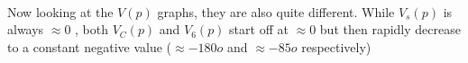 
\paragraph{} Now looking at the $V(p)$ graphs, they are also quite different. While $V_s(p)$ is always
$\approx 0$ , both $V_C(p)$ and $V_6(p)$ start off at $\approx 0$ but then rapidly decrease to a constant negative value ($\approx -180o $ and $\approx -85o$ respectively)




